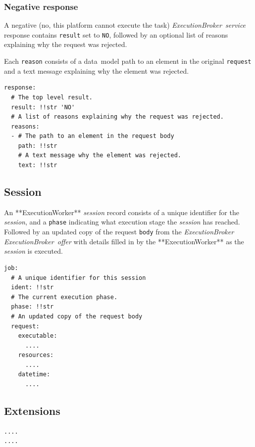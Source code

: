 \documentclass[11pt,a4paper]{ivoa}
\newcommand{\datamodel} {data~model}
\newcommand{\execworkerclass} {**ExecutionWorker**}
\newcommand{\execbrokerclass} {\textit{ExecutionBroker}}
\newcommand{\execbrokerservice}[1] {\textit{ExecutionBroker~service#1}}
\newcommand{\execoffer}[1] {\textit{ExecutionBroker~offer#1}}
\newcommand{\workerjob}[1] {\textit{session#1}}
\newcommand{\codeword}[1] {\texttt{#1}}
\begin{document}
\subsubsection{Negative response}
\label{datamodel-negative-response}

A negative (no, this platform cannot execute the task) \execbrokerservice{} response contains \codeword{result}
set to \codeword{NO}, followed by an optional list of reasons
explaining why the request was rejected.

Each \codeword{reason} consists of a \datamodel{} path to an element in the original
\codeword{request} and a text message explaining why the element was rejected.

\begin{lstlisting}[]
response:
  # The top level result.
  result: !!str 'NO'
  # A list of reasons explaining why the request was rejected.
  reasons:
  - # The path to an element in the request body
    path: !!str
    # A text message why the element was rejected.
    text: !!str
\end{lstlisting}


\subsection{Session}
\label{datamodel-session}

An \execworkerclass{} \workerjob{} record consists of a unique identifier for the \workerjob{},
and a \codeword{phase} indicating what execution stage the \workerjob{} has reached.
Followed by an updated copy of the request \codeword{body} from the \execbrokerclass{}
\execoffer{} with details filled in by the \execworkerclass{} as the \workerjob{} is executed.

\begin{lstlisting}[]
job:
  # A unique identifier for this session
  ident: !!str
  # The current execution phase.
  phase: !!str
  # An updated copy of the request body
  request:
    executable:
      ....
    resources:
      ....
    datetime:
      ....
\end{lstlisting}

\subsection{Extensions}
\label{datamodel-extensions}

\begin{lstlisting}[]
....
....
\end{lstlisting}
\end{document}
